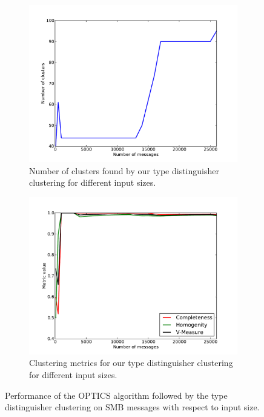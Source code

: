 \documentclass[a4paper]{report}
\begin{document}
\begin{figure}[h]
    \centering
    \begin{subfigure}[t]{0.48\textwidth}
        \includegraphics[width=\textwidth]{img/num_td}
        \caption{Number of clusters found by our type distinguisher clustering
            for different input sizes.}
        \label{fig:num_td}
    \end{subfigure}
    \quad
    \begin{subfigure}[t]{0.48\textwidth}
        \includegraphics[width=\textwidth]{img/metrics_td}
        \caption{Clustering metrics for our type distinguisher clustering for
            different input sizes.}
        \label{fig:metrics_td}
    \end{subfigure}
    \caption{Performance of the OPTICS algorithm followed by the type
        distinguisher clustering on SMB messages with respect to input size.}
    \label{fig:td_res}
\end{figure}
\end{document}
